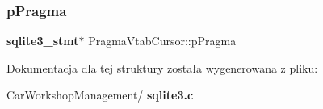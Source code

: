 \mbox{\label{struct_pragma_vtab_cursor_a17a78a26edc2774f649b530fa1f96b94}} 
\subsubsection{pPragma}
{\footnotesize\ttfamily \textbf{ sqlite3\+\_\+stmt}$\ast$ Pragma\+Vtab\+Cursor\+::p\+Pragma}



Dokumentacja dla tej struktury została wygenerowana z pliku\+:\begin{DoxyCompactItemize}
\item 
Car\+Workshop\+Management/\textbf{ sqlite3.\+c}\end{DoxyCompactItemize}
